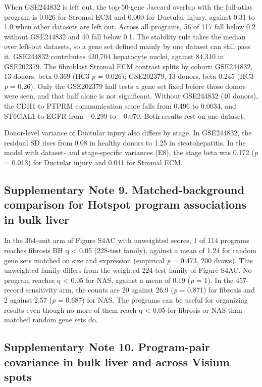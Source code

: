 When GSE244832 is left out, the top-50-gene Jaccard overlap with the full-atlas program is 0.026 for Stromal ECM and 0.000 for Ductular injury, against 0.31 to 1.0 when other datasets are left out. Across all programs, 56 of 117 fall below 0.2 without GSE244832 and 40 fall below 0.1. The stability rule takes the median over left-out datasets, so a gene set defined mainly by one dataset can still pass it. GSE244832 contributes 430,704 hepatocyte nuclei, against 84,310 in GSE202379. The fibroblast Stromal ECM contrast splits by cohort: GSE244832, 13 donors, beta 0.369 (HC3 \emph{p} = 0.026); GSE202379, 13 donors, beta 0.245 (HC3 \emph{p} = 0.26). Only the GSE202379 half tests a gene set fixed before those donors were seen, and that half alone is not significant. Without GSE244832 (40 donors), the CDH1 to PTPRM communication score falls from 0.496 to 0.0034, and ST6GAL1 to EGFR from −0.299 to −0.070. Both results rest on one dataset.

Donor-level variance of Ductular injury also differs by stage. In GSE244832, the residual SD rises from 0.08 in healthy donors to 1.25 in steatohepatitis. In the model with dataset- and stage-specific variances (E8), the stage beta was 0.172 (\emph{p} = 0.013) for Ductular injury and 0.041 for Stromal ECM.

\subsection{Supplementary Note 9. Matched-background comparison for Hotspot program associations in bulk liver}\label{supplementary-note-9.-matched-background-comparison-for-hotspot-program-associations-in-bulk-liver}

In the 364-unit arm of Figure S4AC with unweighted scores, 1 of 114 programs reaches fibrosis BH q \textless{} 0.05 (228-test family), against a mean of 1.24 for random gene sets matched on size and expression (empirical \emph{p} = 0.473, 200 draws). This unweighted family differs from the weighted 224-test family of Figure S4AC. No program reaches q \textless{} 0.05 for NAS, against a mean of 0.19 (\emph{p} = 1). In the 457-record sensitivity arm, the counts are 20 against 26.9 (\emph{p} = 0.871) for fibrosis and 2 against 2.57 (\emph{p} = 0.687) for NAS. The programs can be useful for organizing results even though no more of them reach q \textless{} 0.05 for fibrosis or NAS than matched random gene sets do.

\subsection{Supplementary Note 10. Program-pair covariance in bulk liver and across Visium spots}\label{supplementary-note-10.-program-pair-covariance-in-bulk-liver-and-across-visium-spots}

